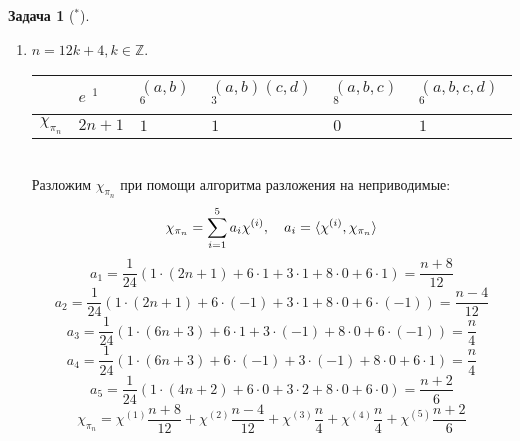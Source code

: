 \documentclass[12pt]{article}
\theoremstyle{definition}
\newtheorem{zad}{Задача}[section]
\begin{document}
\begin{zad}[$^*$]
\begin{itemize}
\begin{enumerate}
    \item $n=12k+4,k\in\mathbb{Z}$.
    \begin{table}[h!]
    \centering
    \begin{tabular}{|l|l|l|l|l|l|}
    \hline
     & $e$ $^1$ & $(a,b)$ $^6$ & $(a,b)(c,d)$ $^3$ & $(a,b,c)$ $^8$ & $(a,b,c,d)$ $^6$ \\ \hline
    $\chi_{\pi_n}$ & $2n+1$ & $1$ & $1$ & $0$ & $1$ \\ \hline
    \end{tabular}
    \end{table}\\
    Разложим $\chi_{\pi_n}$ при помощи алгоритма разложения на неприводимые:
    \begin{equation}
        \chi_{\pi_n}=\sum\limits_{i=1}^5 a_i\chi^{(i)},\quad a_i=\braket{\chi^{(i)},\chi_{\pi_n}}
    \end{equation}
    \begin{equation}
        a_1=\frac{1}{24}(1\cdot(2n+1)+6\cdot1+3\cdot1+8\cdot0+6\cdot1)=\frac{n+8}{12}
    \end{equation}
    \begin{equation}
        a_2=\frac{1}{24}(1\cdot(2n+1)+6\cdot(-1)+3\cdot1+8\cdot0+6\cdot(-1))=\frac{n-4}{12}
    \end{equation}
    \begin{equation}
        a_3=\frac{1}{24}(1\cdot(6n+3)+6\cdot1+3\cdot(-1)+8\cdot0+6\cdot(-1))=\frac{n}{4}
    \end{equation}
    \begin{equation}
        a_4=\frac{1}{24}(1\cdot(6n+3)+6\cdot(-1)+3\cdot(-1)+8\cdot0+6\cdot1)=\frac{n}{4}
    \end{equation}
    \begin{equation}
        a_5=\frac{1}{24}(1\cdot(4n+2)+6\cdot0+3\cdot2+8\cdot0+6\cdot0)=\frac{n+2}{6}
    \end{equation}
    \begin{equation}
        \boxed{\chi_{\pi_n}=\chi^{(1)}\frac{n+8}{12}+\chi^{(2)}\frac{n-4}{12}+\chi^{(3)}\frac{n}{4}+\chi^{(4)}\frac{n}{4}+\chi^{(5)}\frac{n+2}{6}}
    \end{equation}
    

\end{enumerate}
\end{itemize}
\end{zad}
\end{document}
